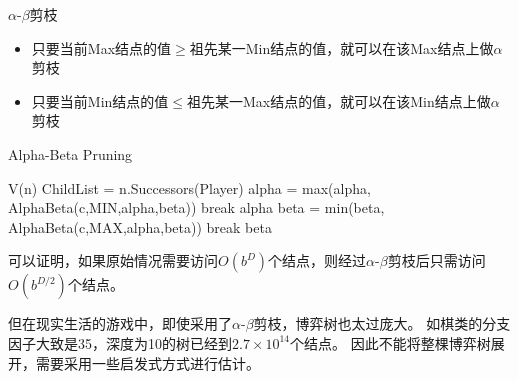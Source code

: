 $\alpha$-$\beta$剪枝
\begin{itemize}
	\item 只要当前Max结点的值$\geq$祖先某一Min结点的值，就可以在该Max结点上做$\alpha$剪枝
	\item 只要当前Min结点的值$\leq$祖先某一Max结点的值，就可以在该Min结点上做$\alpha$剪枝
\end{itemize}
\begin{algorithm}
\caption{Alpha-Beta Pruning}
\begin{algorithmic}[1]
\State \Return V(n)
\EndIf
\State ChildList = n.Successors(Player)
\State alpha = max(alpha, AlphaBeta(c,MIN,alpha,beta))
\State break
\EndIf
\EndFor
\State \Return alpha
\Else{}
\State beta = min(beta, AlphaBeta(c,MAX,alpha,beta))
\State break
\EndIf
\EndFor
\State \Return beta
\EndIf
\EndProcedure{}
\end{algorithmic}
\end{algorithm}
可以证明，如果原始情况需要访问$O(b^D)$个结点，则经过$\alpha$-$\beta$剪枝后只需访问$O(b^{D/2})$个结点。

但在现实生活的游戏中，即使采用了$\alpha$-$\beta$剪枝，博弈树也太过庞大。
如棋类的分支因子大致是35，深度为10的树已经到$2.7\times 10^{14}$个结点。
因此不能将整棵博弈树展开，需要采用一些启发式方式进行估计。
